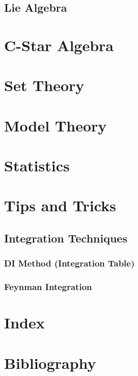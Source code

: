 \documentclass[12pt, english]{book}
\begin{document}
	\chapter{Lie Algebra}
	
	\part{C-Star Algebra} \label{C-Star Algebra Part}
	
	\part{Set Theory} \label{Set Theory Part}
	
	\part{Model Theory} \label{Model Theory Part}
	
	\part{Statistics} \label{Statistics Part}
	\part{Tips and Tricks} \label{Tips and Tricks Part}
	
	\chapter{Integration Techniques} \label{Integration Techniques Chapter - Tips and Tricks}
	
	\section{DI Method (Integration Table)} \label{DI Method Section - Tips and Tricks}
	
	\section{Feynman Integration} \label{Feynman Integration Section - Tips and Tricks}
	
	\backmatter
	\part{Index} \label{Index Part}
	
	\part{Bibliography}
	
	\typeout{}
	
	
\end{document}
